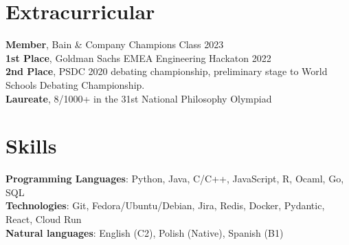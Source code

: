 \documentclass[letterpaper,11pt]{article}
\begin{document}
\section{Extracurricular}
\begin{itemize}[leftmargin=0.15in, label={}]
  \small{\item{
                \textbf{Member}{, Bain \& Company Champions Class 2023} \\
                \textbf{1st Place}{, Goldman Sachs EMEA Engineering Hackaton 2022} \\
                \textbf{2nd Place}{, PSDC 2020 debating championship, preliminary stage to World Schools Debating Championship.} \\
                \textbf{Laureate}{, 8/1000+ in the 31st National Philosophy Olympiad} \\
          }}
\end{itemize}
\vspace{-16pt}

\section{Skills}
\begin{itemize}[leftmargin=0.15in, label={}]
  \small{\item{
                \textbf{Programming Languages}{: Python, Java, C/C++, JavaScript, R,  Ocaml, Go, SQL} \\
                \textbf{Technologies}{: Git, Fedora/Ubuntu/Debian, Jira, Redis, Docker, Pydantic, React, Cloud Run} \\
                \textbf{Natural languages}{: English (C2), Polish (Native), Spanish (B1) } \\
          }}
\end{itemize}
\vspace{-16pt}
\end{document}
